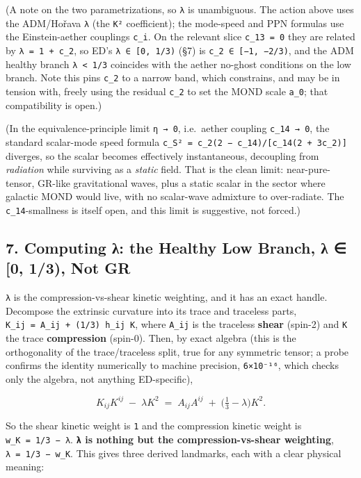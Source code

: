 \documentclass[
]{article}
\begin{document}
(A note on the two parametrizations, so \texttt{λ} is unambiguous. The
action above uses the ADM/Hořava \texttt{λ} (the \texttt{K²}
coefficient); the mode-speed and PPN formulas use the Einstein-aether
couplings \texttt{c\_i}. On the relevant slice \texttt{c\_13\ =\ 0} they
are related by \texttt{λ\ =\ 1\ +\ c\_2}, so ED's
\texttt{λ\ ∈\ {[}0,\ 1/3)} (§7) is \texttt{c\_2\ ∈\ {[}−1,\ −2/3)}, and
the ADM healthy branch \texttt{λ\ \textless{}\ 1/3} coincides with the
aether no-ghost conditions on the low branch. Note this pins
\texttt{c\_2} to a narrow band, which constrains, and may be in tension
with, freely using the residual \texttt{c\_2} to set the MOND scale
\texttt{a\_0}; that compatibility is open.)

(In the equivalence-principle limit \texttt{η\ →\ 0}, i.e.~aether
coupling \texttt{c\_14\ →\ 0}, the standard scalar-mode speed formula
\texttt{c\_S²\ =\ c\_2(2\ −\ c\_14)/{[}c\_14(2\ +\ 3c\_2){]}} diverges,
so the scalar becomes effectively instantaneous, decoupling from
\emph{radiation} while surviving as a \emph{static} field. That is the
clean limit: near-pure-tensor, GR-like gravitational waves, plus a
static scalar in the sector where galactic MOND would live, with no
scalar-wave admixture to over-radiate. The \texttt{c\_14}-smallness is
itself open, and this limit is suggestive, not forced.)

\subsection{7. Computing λ: the Healthy Low Branch, λ ∈ {[}0, 1/3), Not
GR}\label{computing-ux3bb-the-healthy-low-branch-ux3bb-0-13-not-gr}

\texttt{λ} is the compression-vs-shear kinetic weighting, and it has an
exact handle. Decompose the extrinsic curvature into its trace and
traceless parts, \texttt{K\_ij\ =\ A\_ij\ +\ (1/3)\ h\_ij\ K}, where
\texttt{A\_ij} is the traceless \textbf{shear} (spin-2) and \texttt{K}
the trace \textbf{compression} (spin-0). Then, by exact algebra (this is
the orthogonality of the trace/traceless split, true for any symmetric
tensor; a probe confirms the identity numerically to machine precision,
\texttt{6×10⁻¹⁶}, which checks only the algebra, not anything
ED-specific),

\[ K_{ij}K^{ij} \;-\; \lambda K^2 \;=\; A_{ij}A^{ij} \;+\; \Big(\tfrac13 - \lambda\Big) K^2. \]

So the shear kinetic weight is \texttt{1} and the compression kinetic
weight is \texttt{w\_K\ =\ 1/3\ −\ λ}. \textbf{\texttt{λ} is nothing but
the compression-vs-shear weighting}, \texttt{λ\ =\ 1/3\ −\ w\_K}. This
gives three derived landmarks, each with a clear physical meaning:
\end{document}
